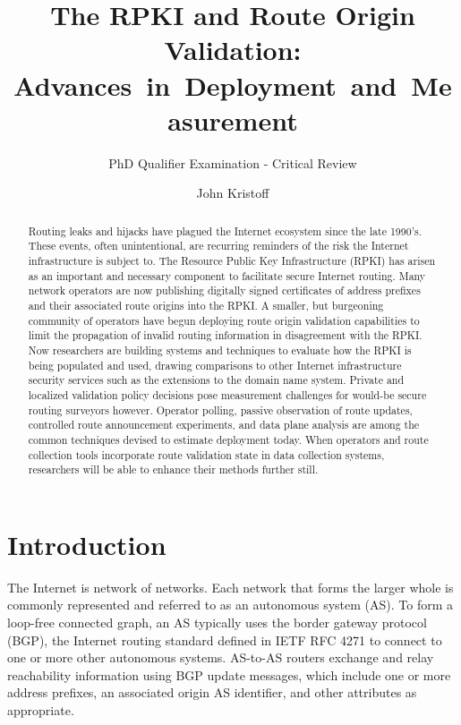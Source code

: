 \documentclass[sigconf]{acmart}
\begin{document}
\title{The RPKI and Route Origin Validation: Advances~in~Deployment~and~Measurement}
\subtitle{PhD Qualifier Examination - Critical Review}
\author{John Kristoff}

\begin{abstract}

Routing leaks and hijacks have plagued the Internet ecosystem since the
late 1990's.  These events, often unintentional, are recurring reminders
of the risk the Internet infrastructure is subject to.  The Resource
Public Key Infrastructure (RPKI) has arisen as an important and
necessary component to facilitate secure Internet routing.  Many network
operators are now publishing digitally signed certificates of address
prefixes and their associated route origins into the RPKI.  A smaller,
but burgeoning community of operators have begun deploying route origin
validation capabilities to limit the propagation of invalid routing
information in disagreement with the RPKI.  Now researchers are building
systems and techniques to evaluate how the RPKI is being populated and
used, drawing comparisons to other Internet infrastructure security
services such as the extensions to the domain name system.  Private and
localized validation policy decisions pose measurement challenges for
would-be secure routing surveyors however.  Operator polling, passive
observation of route updates, controlled route announcement experiments,
and data plane analysis are among the common techniques devised to
estimate deployment today.  When operators and route collection tools
incorporate route validation state in data collection systems,
researchers will be able to enhance their methods further still.

\end{abstract}

\maketitle

\section{Introduction}\label{sec:Introduction}

The Internet is network of networks.  Each network that forms the larger
whole is commonly represented and referred to as an autonomous system
(AS).  To form a loop-free connected graph, an AS typically uses the
border gateway protocol (BGP), the Internet routing standard defined in
IETF RFC 4271 to connect to one or more other autonomous
systems.\cite{rekhter_border_2006}  AS-to-AS routers exchange and relay
reachability information using BGP update messages, which include one or
more address prefixes, an associated origin AS identifier, and other
attributes as appropriate.
\end{document}
